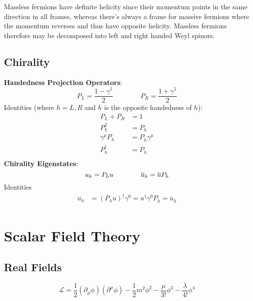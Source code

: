 \documentclass[12pt]{article}
\theoremstyle{definition}
\begin{document}
Massless fermions have definite helicity since their momentum points in the same direction in all frames,
whereas there's always a frame for massive fermions where the momentum reverses and thus have opposite helicity.
Massless fermions therefore may be decomposed into left and right handed Weyl spinors.

\subsection{Chirality}
\textbf{Handedness Projection Operators}:
\begin{equation*}
    P_L = \frac{1 - \gamma^5}{2} \qquad \qquad P_R = \frac{1 + \gamma^5}{2}
\end{equation*}
Identities (where $h = L,R$ and $\overline{h}$ is the opposite handedness of $h$):
\begin{equation*}
\begin{split}
    P_L + P_R &= 1 \\
    P_h^2 &= P_h \\
    \gamma^\mu P_h &= P_{\overline{h}} \gamma^\mu \\
    P_h^\dagger &= P_h \\
\end{split}
\end{equation*}
\textbf{Chirality Eigenstates}: 
\begin{equation*}
    u_h = P_h u \qquad \qquad \overline{u}_h = \overline{u} P_h \\
\end{equation*}
Identities
\begin{equation*}
\begin{split}
    \overline{u_h}
        &= (P_h u)^\dagger \gamma^0 = u^\dagger \gamma^0 P_{\overline{h}} = \overline{u}_{\overline{h}} \\
\end{split}
\end{equation*}

\section{Scalar Field Theory}

\subsection{Real Fields}
\begin{equation*}
    \mathcal{L} = \frac{1}{2} (\partial_\mu \phi)(\partial^\mu \phi) - \frac{1}{2} m^2 \phi^2 - \frac{\mu}{3!} \phi^3 - \frac{\lambda}{4!} \phi^4
\end{equation*}
\end{document}

